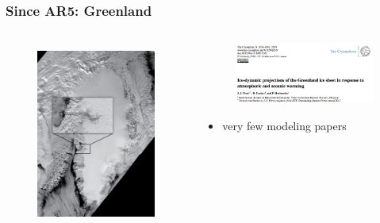\documentclass[hide notes,intlimits]{beamer}
\begin{document}
\begin{frame}
  \frametitle{Since AR5: Greenland}
  \begin{columns}[c]
    \begin{column}{.4\linewidth}
      \begin{figure}
        \includegraphics[height=6cm]{MODISGreenlandJakobshavn}
      \end{figure}
    \end{column}
    \begin{column}{.6\linewidth}
      \begin{figure}
        \includegraphics[width=5cm]{fuerst2015}
      \end{figure}
      \begin{itemize}
      \item very few modeling papers
      \end{itemize}
    \end{column}
  \end{columns}
\end{frame}
\end{document}
